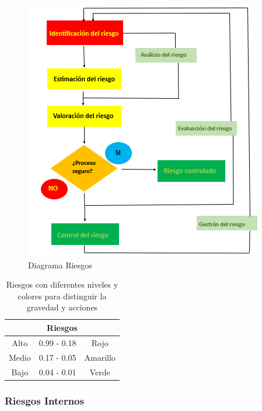 \begin{figure}[H]
    \centering
    \includegraphics[scale=0.4]{10/Img/diagramaRiesgo.png}
    \caption{Diagrama Riesgos}
    \label{fig:diagramaRiesgo.png}
\end{figure}

\begin{table}[h]
        \centering
        \caption{Riesgos con diferentes niveles y colores para distinguir la gravedad y acciones}
        \begin{tabular}{c c c}
        \hline
        \multicolumn{3}{c}{\textbf{Riesgos}}\\
        \hline
             Alto& 0.99 - 0.18 & Rojo  \\
        \hline
             Medio& 0.17 - 0.05 & Amarillo  \\
        \hline
             Bajo& 0.04 - 0.01 & Verde \\
        \hline     
        \end{tabular}
        \label{tab:riego}
    \end{table}
%
%
\subsubsection{Riesgos Internos}

